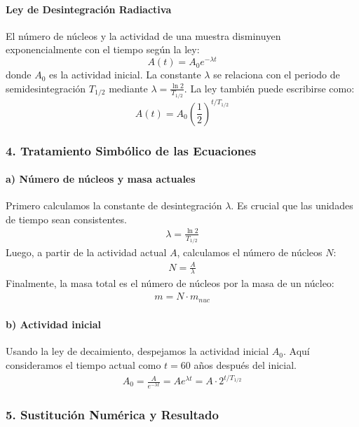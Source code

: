 \paragraph*{Ley de Desintegración Radiactiva}
El número de núcleos y la actividad de una muestra disminuyen exponencialmente con el tiempo según la ley:
$$ A(t) = A_0 e^{-\lambda t} $$
donde $A_0$ es la actividad inicial. La constante $\lambda$ se relaciona con el periodo de semidesintegración $T_{1/2}$ mediante $\lambda = \frac{\ln 2}{T_{1/2}}$. La ley también puede escribirse como:
$$ A(t) = A_0 \left(\frac{1}{2}\right)^{t/T_{1/2}} $$

\subsubsection*{4. Tratamiento Simbólico de las Ecuaciones}
\paragraph*{a) Número de núcleos y masa actuales}
Primero calculamos la constante de desintegración $\lambda$. Es crucial que las unidades de tiempo sean consistentes.
\begin{gather}
    \lambda = \frac{\ln 2}{T_{1/2}}
\end{gather}
Luego, a partir de la actividad actual $A$, calculamos el número de núcleos $N$:
\begin{gather}
    N = \frac{A}{\lambda}
\end{gather}
Finalmente, la masa total es el número de núcleos por la masa de un núcleo:
\begin{gather}
    m = N \cdot m_{nuc}
\end{gather}
\paragraph*{b) Actividad inicial}
Usando la ley de decaimiento, despejamos la actividad inicial $A_0$. Aquí consideramos el tiempo actual como $t=60$ años después del inicial.
\begin{gather}
    A_0 = \frac{A}{e^{-\lambda t}} = A e^{\lambda t} = A \cdot 2^{t/T_{1/2}}
\end{gather}

\subsubsection*{5. Sustitución Numérica y Resultado}
